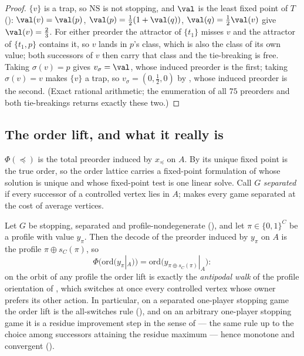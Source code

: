 \begin{proof}
$\{v\}$ is a trap, so $\mathrm{NS}$ is not stopping, and
$\val$ is the least fixed point of $T$ ():
$\val(v)=\val(p)$, $\val(p)=\tfrac12(1+\val(q))$,
$\val(q)=\tfrac12\val(v)$ give $\val(v)=\tfrac23$. For either preorder the
attractor of $\{t_1\}$ misses $v$ and the attractor of $\{t_1,p\}$ contains
it, so $v$ lands in $p$'s class, which is also the class of its own value;
both successors of $v$ then carry that class and the tie-breaking is free.
Taking $\sigma(v)=p$ gives $v_{\sigma}=\val$, whose induced preorder is the
first; taking $\sigma(v)=v$ makes $\{v\}$ a trap, so
$v_\sigma=(0,\tfrac12,0)$ by , whose induced
preorder is the second. (Exact rational arithmetic; the enumeration of all
$75$ preorders and both tie-breakings returns exactly these two.)
\end{proof}

\subsection{The order lift, and what it really is}\label{ol:sec-lift}

\begin{definition}\label{ol:def-lift}
$\Phi(\preceq)$ is the total preorder induced by $x_\preceq$ on $A$. By
 its unique fixed point is the true order, so the order
lattice carries a fixed-point formulation of  whose
solution is unique and whose fixed-point test is one linear solve. Call $G$
\emph{separated} if every successor of a controlled vertex lies in $A$;
 makes every game separated at the cost of average
vertices.
\end{definition}

\begin{proposition}
\label{ol:profile-walk}
Let $G$ be stopping, separated and profile-nondegenerate
(), and let $\pi\in\{0,1\}^{C}$ be a profile
with value $y_\pi$. Then the decode of the preorder induced by $y_\pi$ on
$A$ is the profile $\pi\oplus s_C(\pi)$, so
\[
  \Phi\bigl(\mathrm{ord}(y_\pi|_A)\bigr)=\mathrm{ord}\bigl(y_{\pi\oplus s_C(\pi)}|_A\bigr):
\]
on the orbit of any profile the order lift is exactly the \emph{antipodal
walk} of the profile orientation of , which
switches at once every controlled vertex whose owner prefers its other
action. In particular, on a separated one-player stopping game the order
lift is the all-switches rule (), and on an arbitrary
one-player stopping game it is a residue improvement step in the sense of
 --- the same rule up to the choice among successors
attaining the residue maximum --- hence monotone and convergent
().
\end{proposition}

